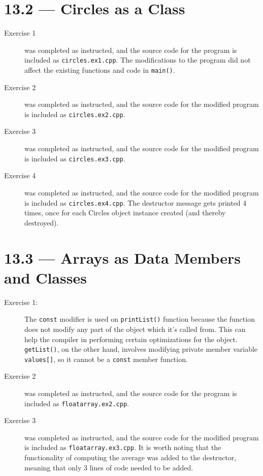 \documentclass[11pt]{article}
\begin{document}
\section*{13.2 --- Circles as a Class}
\begin{description}
    \item[Exercise 1] was completed as instructed, and the source code for the program is included as \texttt{circles.ex1.cpp}. The modifications to the program did not affect the existing functions and code in \lstinline{main()}.
    \item[Exercise 2] was completed as instructed, and the source code for the modified program is included as \texttt{circles.ex2.cpp}.
    \item[Exercise 3] was completed as instructed, and the source code for the modified program is included as \texttt{circles.ex3.cpp}.
    \item[Exercise 4] was completed as instructed, and the source code for the modified program is included as \texttt{circles.ex4.cpp}. The destructor message gets printed 4 times, once for each Circles object instance created (and thereby destroyed).
\end{description}

\section*{13.3 --- Arrays as Data Members and Classes}
\begin{description}
    \item[Exercise 1:] The \lstinline{const} modifier is used on \lstinline{printList()} function because the function does not modify any part of the object which it's called from. This can help the compiler in performing certain optimizations for the object. \lstinline{getList()}, on the other hand, involves modifying private member variable \lstinline{values[]}, so it cannot be a \lstinline{const} member function.
    \item[Exercise 2] was completed as instructed, and the source code for the program is included as \texttt{floatarray.ex2.cpp}.
    \item[Exercise 3] was completed as instructed, and the source code for the modified program is included as \texttt{floatarray.ex3.cpp}. It is worth noting that the functionality of computing the average was added to the destructor, meaning that only 3 lines of code needed to be added.
\end{description}
\end{document}
